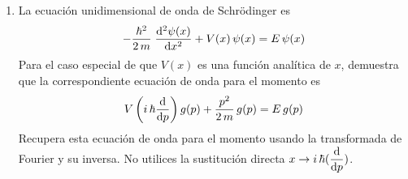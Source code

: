 \begin{enumerate}
\item La ecuación unidimensional de onda de Schrödinger es
\[ - \dfrac{\hbar^{2}}{2 \, m} \; \dv[2]{\psi(x)}{x} +  V(x) \, \psi(x) = E \, \psi (x) \]
Para el caso especial de que $V(x)$ es una función analítica de $x$, demuestra que la correspondiente ecuación de onda para el momento es
\[ V \left( i \, \hbar \dv{p} \right) g(p) + \dfrac{p^{2}}{2 \, m} \, g(p) =  E \, g(p)  \]
Recupera esta ecuación de onda para el momento usando la transformada de Fourier y su inversa. No utilices la sustitución directa $\displaystyle{x \to i \, \hbar (\dv{p})}$.
\end{enumerate}
